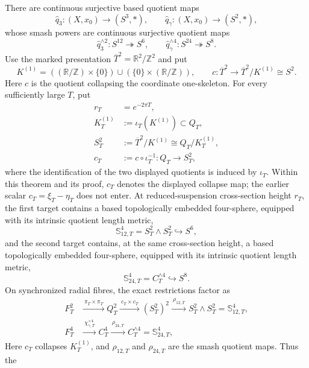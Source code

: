 \begin{theorem}
There are continuous surjective based quotient maps
\[
 \widehat q_3:(X,x_0)\longrightarrow(S^3,*),
 \qquad
 \widehat q_\gamma:(X,x_0)\longrightarrow(S^2,*),
\]
whose smash powers are continuous surjective quotient maps
\begin{equation}
 \widehat q_3^{\wedge2}:S^{12}\twoheadrightarrow S^6,
 \qquad
 \widehat q_\gamma^{\wedge4}:S^{24}\twoheadrightarrow S^8.
 \label{wb:cusp-cone-sphere-to-sphere-maps}
\end{equation}
Use the marked presentation \(\overline T^2=\mathbb R^2/\mathbb Z^2\) and
put
\[
 K^{(1)}
 =((\mathbb R/\mathbb Z)\times\{0\})
  \cup(\{0\}\times(\mathbb R/\mathbb Z)),
 \qquad
 c:\overline T^2\longrightarrow\overline T^2/K^{(1)}\cong S^2.
\]
Here \(c\) is the quotient collapsing the coordinate one-skeleton.  For
every sufficiently large \(T\), put
\begin{align*}
 r_T&=e^{-2\pi T},\\
 K_T^{(1)}&:=\iota_T(K^{(1)})\subset Q_T,\\
 S_T^2&:=\overline T^2/K^{(1)}\cong Q_T/K_T^{(1)},\\
 c_T&:=c\circ\iota_T^{-1}:Q_T\longrightarrow S_T^2,
\end{align*}
where the identification of the two displayed quotients is induced by
\(\iota_T\).  Within this theorem and its proof, \(c_T\) denotes the
displayed collapse map; the earlier scalar \(c_T=\xi_T-\eta_T\) does not
enter.
At reduced-suspension cross-section height \(r_T\), the first target contains
a based topologically embedded four-sphere, equipped with its intrinsic
quotient length metric,
\[
 \mathbb S_{12,T}^4=S_T^2\wedge S_T^2\hookrightarrow S^6,
\]
and the second target contains, at the same cross-section height, a based
topologically embedded four-sphere, equipped with its intrinsic quotient
length metric,
\[
 \mathbb S_{24,T}^4=C_T^{\wedge4}\hookrightarrow S^8.
\]
On synchronized radial fibres, the exact restrictions factor as
\begin{align}
 F_T^2&\xrightarrow{\ \pi_T\times\pi_T\ }
 Q_T^2\xrightarrow{\ c_T\times c_T\ }(S_T^2)^2
 \xrightarrow{\ \rho_{12,T}\ }S_T^2\wedge S_T^2
 =\mathbb S_{12,T}^4,
 \label{wb:cusp-cone-S12-S4-radial-map}\\
 F_T^4&\xrightarrow{\ \chi_{\gamma,T}^{\times4}\ }
 C_T^4\xrightarrow{\ \rho_{24,T}\ }C_T^{\wedge4}
 =\mathbb S_{24,T}^4,
 \label{wb:cusp-cone-S24-S4-radial-map}
\end{align}
Here \(c_T\) collapses \(K_T^{(1)}\), and \(\rho_{12,T}\) and
\(\rho_{24,T}\) are the smash quotient maps.  Thus the

\end{theorem}
